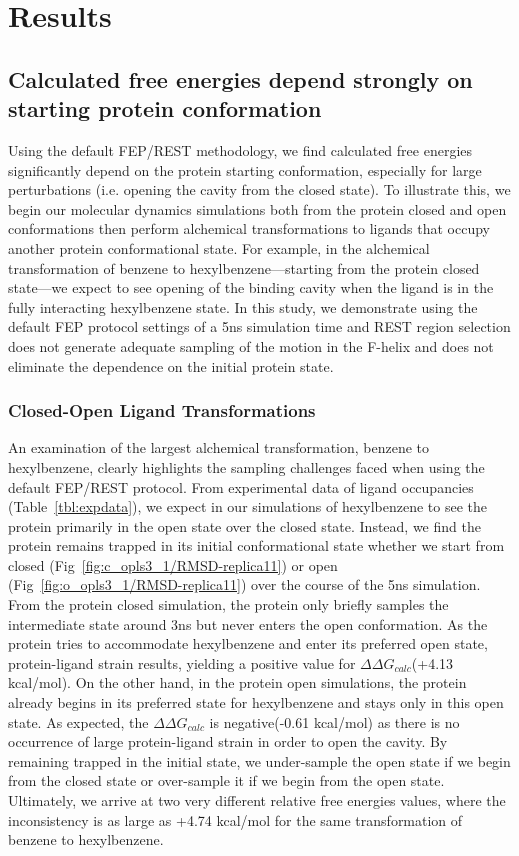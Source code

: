 \documentclass[journal=jctcce,manuscript=article]{achemso}
\begin{document}
\section{Results}
\subsection*{Calculated free energies depend strongly on starting protein conformation}
Using the default FEP/REST methodology\cite{FEP/REST}, we find calculated free energies significantly depend on the protein starting conformation, especially for large perturbations (i.e. opening the cavity from the closed state).
To illustrate this, we begin our molecular dynamics simulations both from the protein closed and open conformations then perform alchemical transformations to ligands that occupy another protein conformational state.
For example, in the alchemical transformation of benzene to hexylbenzene---starting from the protein closed state---we expect to see opening of the binding cavity when the ligand is in the fully interacting hexylbenzene state.
In this study, we demonstrate using the default FEP protocol settings of a 5ns simulation time and REST region selection does not generate adequate sampling of the motion in the F-helix and does not eliminate the dependence on the initial protein state.

\subsubsection*{Closed-Open Ligand Transformations}
An examination of the largest alchemical transformation, benzene to hexylbenzene, clearly highlights the sampling challenges faced when using the default FEP/REST protocol.
From experimental data of ligand occupancies (Table~\ref{tbl:expdata}), we expect in our simulations of hexylbenzene to see the protein primarily in the open state over the closed state.
Instead, we find the protein remains trapped in its initial conformational state whether we start from closed (Fig~\ref{fig:c_opls3_1/RMSD-replica11}) or open (Fig~\ref{fig:o_opls3_1/RMSD-replica11}) over the course of the 5ns simulation.
From the protein closed simulation, the protein only briefly samples the intermediate state around 3ns but never enters the open conformation.
As the protein tries to accommodate hexylbenzene and enter its preferred open state, protein-ligand strain results, yielding a positive value for $\Delta\Delta G_{calc}$(+4.13 kcal/mol).
On the other hand, in the protein open simulations, the protein already begins in its preferred state for hexylbenzene and stays only in this open state.
As expected, the $\Delta\Delta G_{calc}$ is negative(-0.61 kcal/mol) as there is no occurrence of large protein-ligand strain in order to open the cavity.
By remaining trapped in the initial state, we under-sample the open state if we begin from the closed state or over-sample it if we begin from the open state.
Ultimately, we arrive at two very different relative free energies values, where the inconsistency is as large as +4.74 kcal/mol for the same transformation of benzene to hexylbenzene.
\end{document}
